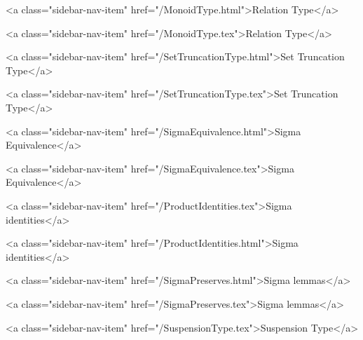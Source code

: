      
    
      
        
          <a class="sidebar-nav-item" href="/MonoidType.html">Relation Type</a>
        
      
    
      
        
          <a class="sidebar-nav-item" href="/MonoidType.tex">Relation Type</a>
        
      
    
      
        
          <a class="sidebar-nav-item" href="/SetTruncationType.html">Set Truncation Type</a>
        
      
    
      
        
          <a class="sidebar-nav-item" href="/SetTruncationType.tex">Set Truncation Type</a>
        
      
    
      
        
          <a class="sidebar-nav-item" href="/SigmaEquivalence.html">Sigma Equivalence</a>
        
      
    
      
        
          <a class="sidebar-nav-item" href="/SigmaEquivalence.tex">Sigma Equivalence</a>
        
      
    
      
        
          <a class="sidebar-nav-item" href="/ProductIdentities.tex">Sigma identities</a>
        
      
    
      
        
          <a class="sidebar-nav-item" href="/ProductIdentities.html">Sigma identities</a>
        
      
    
      
        
          <a class="sidebar-nav-item" href="/SigmaPreserves.html">Sigma lemmas</a>
        
      
    
      
        
          <a class="sidebar-nav-item" href="/SigmaPreserves.tex">Sigma lemmas</a>
        
      
    
      
        
          <a class="sidebar-nav-item" href="/SuspensionType.tex">Suspension Type</a>
        

